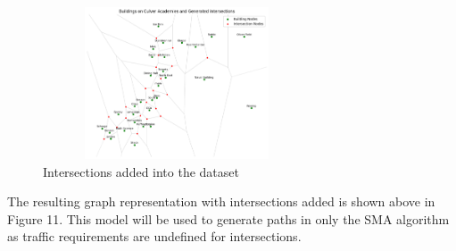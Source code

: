 \documentclass[11pt]{article}
\begin{document}
\begin{figure}[H]
\centering
\includegraphics[height=170px, width=300px]{intersections.png}
\caption{Intersections added into the dataset}
\end{figure}
\par
	The resulting graph representation with intersections added is shown above in Figure 11. This model will be used to generate paths in only the SMA algorithm as traffic requirements are undefined for intersections.
\end{document}
